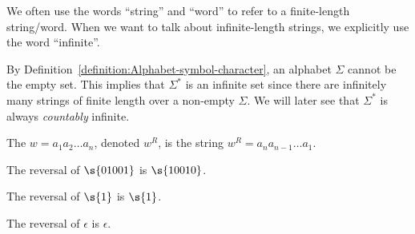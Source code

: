 \begin{note} \label{note:Finite-vs-infinite-strings}
We often use the words ``string'' and ``word'' to refer to a finite-length string/word. 
When we want to talk about infinite-length strings, we explicitly use the word ``infinite''.
\end{note}


\begin{note} \label{note:Size-of-Sigma}
By Definition~\ref{definition:Alphabet-symbol-character}, an alphabet $\Sigma$ cannot be the empty set. 
This implies that $\Sigma^*$ is an infinite set since there are infinitely many strings of finite length over a non-empty $\Sigma$. We will later see that $\Sigma^*$ is always \emph{countably} infinite.
\end{note}


\begin{flex}
\begin{definition} \label{definition:Reversal-of-a-string}
The  $w = a_1a_2\ldots a_n$, denoted $w^R$, is the string $w^R = a_na_{n-1}\ldots a_1$.
\end{definition}

\begin{example}[Reversal of $01001$] \label{example:Reversal-of-01001}
The reversal of $\s{01001}$ is $\s{10010}$.
\end{example}

\begin{example}[Reversal of $1$] \label{example:Reversal-of-1}
The reversal of $\s{1}$ is $\s{1}$.
\end{example}

\begin{example} \label{example:Reversal-of-epsilon}
The reversal of $\epsilon$ is $\epsilon$.
\end{example}
\end{flex}


